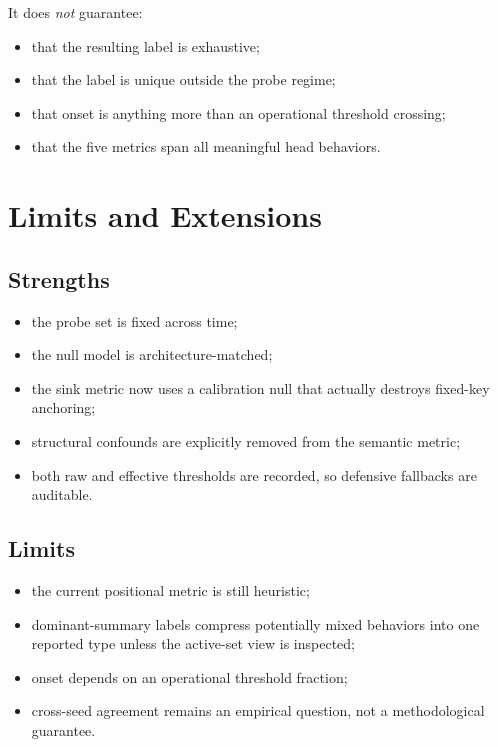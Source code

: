 \documentclass[11pt]{article}
\newcommand{\1}{\mathbf{1}}
\begin{document}
It does \emph{not} guarantee:
\begin{itemize}
\item that the resulting label is exhaustive;
\item that the label is unique outside the probe regime;
\item that onset is anything more than an operational threshold crossing;
\item that the five metrics span all meaningful head behaviors.
\end{itemize}

\section{Limits and Extensions}

\subsection{Strengths}

\begin{itemize}
\item the probe set is fixed across time;
\item the null model is architecture-matched;
\item the sink metric now uses a calibration null that actually destroys
fixed-key anchoring;
\item structural confounds are explicitly removed from the semantic metric;
\item both raw and effective thresholds are recorded, so defensive fallbacks are
auditable.
\end{itemize}

\subsection{Limits}

\begin{itemize}
\item the current positional metric is still heuristic;
\item dominant-summary labels compress potentially mixed behaviors into one
reported type unless the active-set view is inspected;
\item onset depends on an operational threshold fraction;
\item cross-seed agreement remains an empirical question, not a methodological
guarantee.
\end{itemize}
\end{document}
